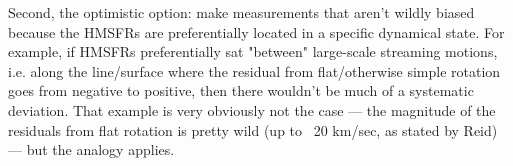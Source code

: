 Second, the optimistic option: \citet{Reid} make measurements that aren't wildly biased because the HMSFRs are preferentially located in a specific dynamical state. 
For example, if HMSFRs preferentially sat "between" large-scale streaming motions, i.e. along the line/surface where the residual from flat/otherwise simple rotation goes from negative to positive, then there wouldn't be much of a systematic deviation.
That example is very obviously not the case --- the magnitude of the residuals from flat rotation is pretty wild (up to ~20 km/sec, as stated by Reid) --- but the analogy applies. 




